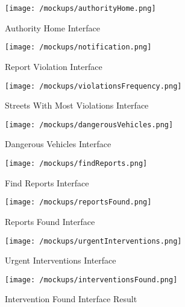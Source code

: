 	\begin{figure}[h]
		\centering
		\begin{minipage}{0.45\textwidth}
			\centering
			\texttt{[image: /mockups/authorityHome.png]}
			\caption{Authority Home Interface}
		\end{minipage}\hfill
		\begin{minipage}{0.45\textwidth}
			\centering
			\texttt{[image: /mockups/notification.png]}
			\caption{Report Violation Interface}
		\end{minipage}
	\end{figure}

	\begin{figure}[h]
		\centering
		\begin{minipage}{0.45\textwidth}
			\centering
			\texttt{[image: /mockups/violationsFrequency.png]}
			\caption{Streets With Most Violations Interface}
		\end{minipage}\hfill
		\begin{minipage}{0.45\textwidth}
			\centering
			\texttt{[image: /mockups/dangerousVehicles.png]}
			\caption{Dangerous Vehicles Interface}
		\end{minipage}
	\end{figure}

	\begin{figure}[h]
		\centering
		\begin{minipage}{0.48\textwidth}
			\centering
			\texttt{[image: /mockups/findReports.png]}
			\caption{Find Reports Interface}
		\end{minipage}\hfill
		\begin{minipage}{0.48\textwidth}
			\centering
			\texttt{[image: /mockups/reportsFound.png]}
			\caption{Reports Found Interface}
		\end{minipage}
	\end{figure}

	\begin{figure}[h]
		\centering
		\begin{minipage}{0.48\textwidth}
			\centering
			\texttt{[image: /mockups/urgentInterventions.png]}
			\caption{Urgent Interventions Interface}
		\end{minipage}\hfill
		\begin{minipage}{0.48\textwidth}
			\centering
			\texttt{[image: /mockups/interventionsFound.png]}
			\caption{Intervention Found Interface Result}
		\end{minipage}
	\end{figure}
	 
